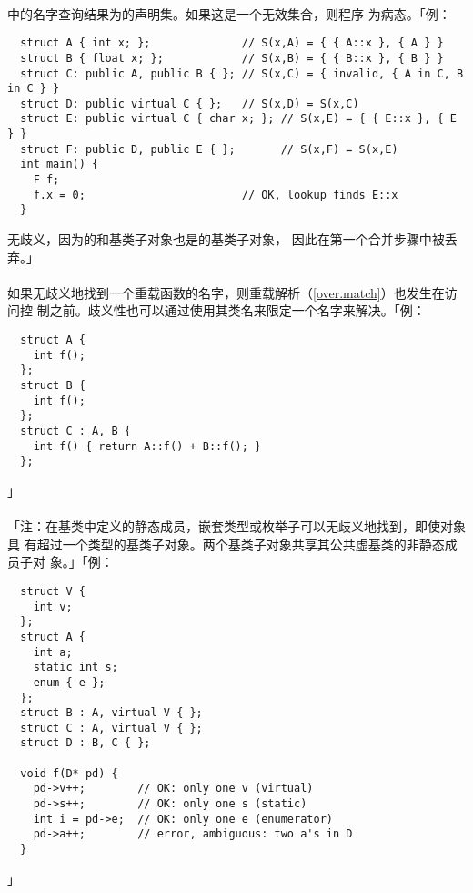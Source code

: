 \paragraph{}
中的名字查询结果为的声明集。如果这是一个无效集合，则程序
为病态。「例：
\begin{lstlisting}
  struct A { int x; };              // S(x,A) = { { A::x }, { A } }
  struct B { float x; };            // S(x,B) = { { B::x }, { B } }
  struct C: public A, public B { }; // S(x,C) = { invalid, { A in C, B in C } }
  struct D: public virtual C { };   // S(x,D) = S(x,C)
  struct E: public virtual C { char x; }; // S(x,E) = { { E::x }, { E } }
  struct F: public D, public E { };       // S(x,F) = S(x,E)
  int main() {
    F f;
    f.x = 0;                        // OK, lookup finds E::x
  }
\end{lstlisting}
无歧义，因为的和基类子对象也是的基类子对象，
因此在第一个合并步骤中被丢弃。」

\paragraph{}
如果无歧义地找到一个重载函数的名字，则重载解析（\ref{over.match}）也发生在访问控
制之前。歧义性也可以通过使用其类名来限定一个名字来解决。「例：
\begin{lstlisting}
  struct A {
    int f();
  };
  struct B {
    int f();
  };
  struct C : A, B {
    int f() { return A::f() + B::f(); }
  };
\end{lstlisting}」

\paragraph{}
「注：在基类中定义的静态成员，嵌套类型或枚举子可以无歧义地找到，即使对象具
有超过一个类型的基类子对象。两个基类子对象共享其公共虚基类的非静态成员子对
象。」「例：
\begin{lstlisting}
  struct V {
    int v;
  };
  struct A {
    int a;
    static int s;
    enum { e };
  };
  struct B : A, virtual V { };
  struct C : A, virtual V { };
  struct D : B, C { };

  void f(D* pd) {
    pd->v++;        // OK: only one v (virtual)
    pd->s++;        // OK: only one s (static)
    int i = pd->e;  // OK: only one e (enumerator)
    pd->a++;        // error, ambiguous: two a's in D
  }
\end{lstlisting}」


